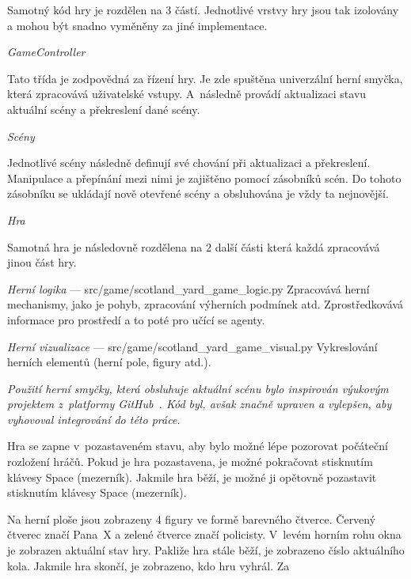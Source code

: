 Samotný kód hry je rozdělen na 3 částí.
Jednotlivé vrstvy hry jsou tak izolovány a mohou být snadno vyměněny za jiné implementace.

\begin{myitemize}
  \item \emph{GameController}~\cite{GameSceneController}
  
  Tato třída je zodpovědná za řízení hry.
  Je zde spuštěna univerzální herní smyčka, která zpracovává uživatelské vstupy.
  A~následně provádí aktualizaci stavu aktuální scény a překreslení dané scény.
  \item \emph{Scény}~\cite{GameSceneController}
  
  Jednotlivé scény následně definují své chování při aktualizaci a překreslení.
  Manipulace a přepínání mezi nimi je zajištěno pomocí zásobníků scén.
  Do tohoto zásobníku se ukládají nově otevřené scény a obsluhována je vždy ta nejnovější.

  \item \emph{Hra}

    Samotná hra je následovně rozdělena na 2 další části která každá zpracovává jinou část hry.
    \begin{myitemize}
      \item \emph{Herní logika} --- src/game/scotland\_yard\_game\_logic.py
      Zpracovává herní mechanismy, jako je pohyb, zpracování výherních podmínek atd.
      Zprostředkovává informace pro prostředí a to poté pro učící se agenty.

      \item \emph{Herní vizualizace} ---  src/game/scotland\_yard\_game\_visual.py
      Vykreslování herních elementů (herní pole, figury atd.).
    \end{myitemize}
\end{myitemize}

\textit{Použití herní smyčky, která obsluhuje aktuální scénu bylo inspirován výukovým projektem z~platformy GitHub~\cite{GameSceneController}.
Kód byl, avšak značně upraven a vylepšen, aby vyhovoval integrování do této práce.}

Hra se zapne v~pozastaveném stavu, aby bylo možné lépe pozorovat počáteční rozložení hráčů.
Pokud je hra pozastavena, je možné pokračovat stisknutím klávesy Space (mezerník).
Jakmile hra běží, je možné ji opětovně pozastavit stisknutím klávesy Space (mezerník).


Na herní ploše jsou zobrazeny 4 figury ve formě barevného čtverce.
Červený čtverec značí Pana~X a zelené čtverce značí policisty.
V~levém horním rohu okna je zobrazen aktuální stav hry.
Pakliže hra stále běží, je zobrazeno číslo aktuálního kola.
Jakmile hra skončí, je zobrazeno, kdo hru vyhrál.
Za 

